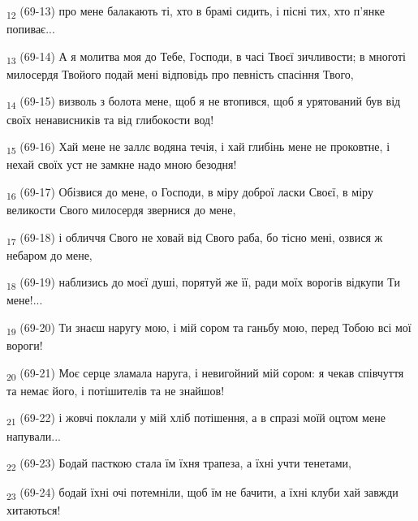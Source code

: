 \begin{tcolorbox}
\textsubscript{12} (69-13) про мене балакають ті, хто в брамі сидить, і пісні тих, хто п'янке попиває...
\end{tcolorbox}
\begin{tcolorbox}
\textsubscript{13} (69-14) А я молитва моя до Тебе, Господи, в часі Твоєї зичливости; в многоті милосердя Твойого подай мені відповідь про певність спасіння Твого,
\end{tcolorbox}
\begin{tcolorbox}
\textsubscript{14} (69-15) визволь з болота мене, щоб я не втопився, щоб я урятований був від своїх ненависників та від глибокости вод!
\end{tcolorbox}
\begin{tcolorbox}
\textsubscript{15} (69-16) Хай мене не заллє водяна течія, і хай глибінь мене не проковтне, і нехай своїх уст не замкне надо мною безодня!
\end{tcolorbox}
\begin{tcolorbox}
\textsubscript{16} (69-17) Обізвися до мене, о Господи, в міру доброї ласки Своєї, в міру великости Свого милосердя звернися до мене,
\end{tcolorbox}
\begin{tcolorbox}
\textsubscript{17} (69-18) і обличчя Свого не ховай від Свого раба, бо тісно мені, озвися ж небаром до мене,
\end{tcolorbox}
\begin{tcolorbox}
\textsubscript{18} (69-19) наблизись до моєї душі, порятуй же її, ради моїх ворогів відкупи Ти мене!...
\end{tcolorbox}
\begin{tcolorbox}
\textsubscript{19} (69-20) Ти знаєш наругу мою, і мій сором та ганьбу мою, перед Тобою всі мої вороги!
\end{tcolorbox}
\begin{tcolorbox}
\textsubscript{20} (69-21) Моє серце зламала наруга, і невигойний мій сором: я чекав співчуття та немає його, і потішителів та не знайшов!
\end{tcolorbox}
\begin{tcolorbox}
\textsubscript{21} (69-22) і жовчі поклали у мій хліб потішення, а в спразі моїй оцтом мене напували...
\end{tcolorbox}
\begin{tcolorbox}
\textsubscript{22} (69-23) Бодай пасткою стала їм їхня трапеза, а їхні учти тенетами,
\end{tcolorbox}
\begin{tcolorbox}
\textsubscript{23} (69-24) бодай їхні очі потемніли, щоб їм не бачити, а їхні клуби хай завжди хитаються!
\end{tcolorbox}
